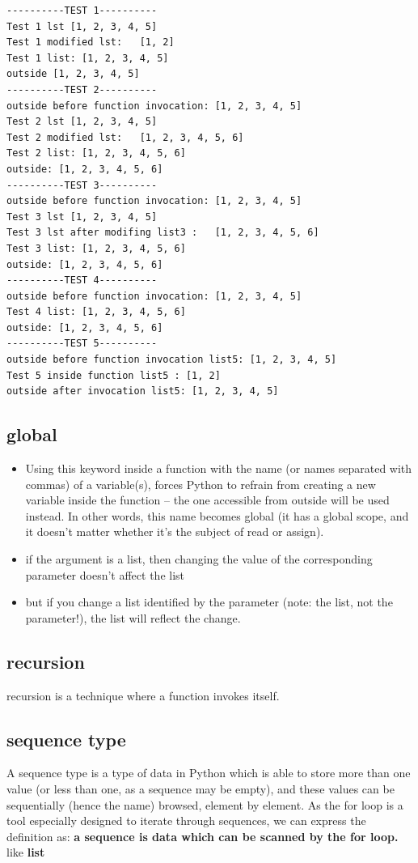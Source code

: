 \documentclass[11pt]{article}
\begin{document}
\begin{verbatim}
----------TEST 1----------
Test 1 lst [1, 2, 3, 4, 5]
Test 1 modified lst:   [1, 2]
Test 1 list: [1, 2, 3, 4, 5]
outside [1, 2, 3, 4, 5]
----------TEST 2----------
outside before function invocation: [1, 2, 3, 4, 5]
Test 2 lst [1, 2, 3, 4, 5]
Test 2 modified lst:   [1, 2, 3, 4, 5, 6]
Test 2 list: [1, 2, 3, 4, 5, 6]
outside: [1, 2, 3, 4, 5, 6]
----------TEST 3----------
outside before function invocation: [1, 2, 3, 4, 5]
Test 3 lst [1, 2, 3, 4, 5]
Test 3 lst after modifing list3 :   [1, 2, 3, 4, 5, 6]
Test 3 list: [1, 2, 3, 4, 5, 6]
outside: [1, 2, 3, 4, 5, 6]
----------TEST 4----------
outside before function invocation: [1, 2, 3, 4, 5]
Test 4 list: [1, 2, 3, 4, 5, 6]
outside: [1, 2, 3, 4, 5, 6]
----------TEST 5----------
outside before function invocation list5: [1, 2, 3, 4, 5]
Test 5 inside function list5 : [1, 2]
outside after invocation list5: [1, 2, 3, 4, 5]
\end{verbatim}

\subsection{global}
\label{sec:org02dab1a}
\begin{itemize}
\item Using this keyword inside a function with the name (or names
separated with commas) of a variable(s), forces Python to refrain
from creating a new variable inside the function – the one accessible
from outside will be used instead. In other words, this name becomes
global (it has a global scope, and it doesn’t matter whether it’s the
subject of read or assign).
\item if the argument is a list, then changing the value of the
corresponding parameter doesn’t affect the list
\item but if you change a list identified by the parameter (note: the
list, not the parameter!), the list will reflect the change.
\end{itemize}

\subsection{recursion}
\label{sec:org35e992f}
recursion is a technique where a function invokes itself.
\subsection{sequence type}
\label{sec:org3b9221e}
A sequence type is a type of data in Python which is able to store
more than one value (or less than one, as a sequence may be empty),
and these values can be sequentially (hence the name) browsed,
element by element. As the for loop is a tool especially designed to
iterate through sequences, we can express the definition as:
\textbf{a sequence is data which can be scanned by the for loop.} like \textbf{list}
\end{document}
